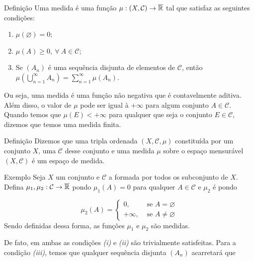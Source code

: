 \begin{env}{Definição}
\label{def:medida}
    Uma medida é uma função $\mu: (X, \mathcal{C}) \to \operatorname{\overline{\mathbb{R}}}$ tal que satisfaz as seguintes condições:
    \begin{enumerate}[label* = (\roman*)]
        \item $\mu(\varnothing) = 0$;
        \item $\mu(A) \geq 0, \ \forall \ A \in \mathcal{C}$;
        \item Se $(A_n)$ é uma sequência disjunta de elementos de  $\mathcal{C}$, então 
        $\displaystyle\mu\left(\bigcup_{n = 1}^\infty A_n\right) = \sum_{n = 1}^\infty\mu(A_n)$.
        
    \end{enumerate}
\end{env}

Ou seja, uma medida é uma função não negativa que é contavelmente aditiva.
Além disso, o valor de $\mu$ pode ser igual à $+\infty$ para algum conjunto $A \in \mathcal{C}$.
Quando temos que $\mu(E) < +\infty$ para qualquer que seja o conjunto $E \in \mathcal{C}$, dizemos que temos uma medida finita.

\begin{env}{Definição}
	\label{def:espaço-de-medida}
	Dizemos que uma tripla ordenada $(X, \mathcal{C}, \mu)$ constituída por um conjunto $X$, uma \sigal $\mathcal{C}$ desse conjunto e uma medida $\mu$ sobre o espaço mensurável $(X, \mathcal{C})$ é um espaço de medida.
\end{env}


\begin{env}{Exemplo}
    Seja $X$ um conjunto e $\mathcal{C}$ a \sigal formada por todos os subconjunto de $X$.    
    Defina $\mu_1, \mu_2:\mathcal{C} \to \operatorname{\overline{\mathbb{R}}}$ pondo $\mu_1(A) = 0$ para qualquer  $A \in \mathcal{C}$ e 
    $\mu_2$ é  pondo 

$$\mu_2(A) = \left\{\begin{array}{cc}
0, & \textrm{\ se \ } A = \varnothing \\
+\infty,& \textrm{\ se \ } A \neq \varnothing
\end{array}\right.$$
Sendo definidas dessa forma, as funções $\mu_1$ e $\mu_2$ são medidas.
\end{env}

De fato, em ambas as condições \textit{(i)} e \textit{(ii)} são trivialmente satisfeitas.
Para a condição \textit{(iii)}, temos que qualquer sequência disjunta $(A_n)$ acarretará que

